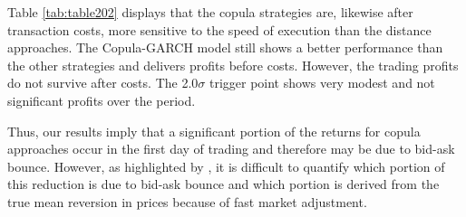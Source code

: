 \documentclass[a4paper,12pt]{report}
\begin{document}
Table \ref{tab:table202} displays that the copula strategies are, likewise after transaction costs, more sensitive to the speed of execution than the distance approaches. The Copula-GARCH model still shows a better performance than the other strategies and delivers profits before costs. However, the trading profits do not survive after costs. The 2.0$\sigma$ trigger point shows very modest and not significant profits over the period.

Thus, our results imply that a significant portion of the returns for copula approaches occur in the first day of trading and therefore may be due to bid-ask bounce. However, as highlighted by \citet*{ggr06}, it is difficult to quantify which portion of this reduction is due to bid-ask bounce and which portion is derived from the true mean reversion in prices because of fast market adjustment.

\medskip
\end{document}

